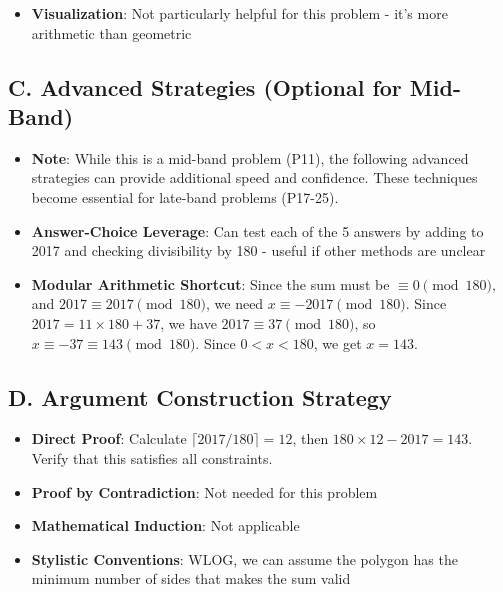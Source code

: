 \documentclass[]{article}
\begin{document}
\begin{strategicbox}
\begin{itemize}[leftmargin=*]
    \item \textbf{Visualization}: Not particularly helpful for this problem - it's more arithmetic than geometric
\end{itemize}

\subsection*{C. Advanced Strategies (Optional for Mid-Band)}
\begin{itemize}[leftmargin=*]
    \item \textbf{Note}: While this is a mid-band problem (P11), the following advanced strategies can provide additional speed and confidence. These techniques become essential for late-band problems (P17-25).
    
    \item \textbf{Answer-Choice Leverage}: Can test each of the 5 answers by adding to 2017 and checking divisibility by 180 - useful if other methods are unclear
    
    \item \textbf{Modular Arithmetic Shortcut}: Since the sum must be $\equiv 0 \pmod{180}$, and $2017 \equiv 2017 \pmod{180}$, we need $x \equiv -2017 \pmod{180}$. Since $2017 = 11 \times 180 + 37$, we have $2017 \equiv 37 \pmod{180}$, so $x \equiv -37 \equiv 143 \pmod{180}$. Since $0 < x < 180$, we get $x = 143$.
\end{itemize}

\subsection*{D. Argument Construction Strategy}
\begin{itemize}[leftmargin=*]
    \item \textbf{Direct Proof}: Calculate $\lceil 2017/180 \rceil = 12$, then $180 \times 12 - 2017 = 143$. Verify that this satisfies all constraints.
    
    \item \textbf{Proof by Contradiction}: Not needed for this problem
    
    \item \textbf{Mathematical Induction}: Not applicable
    
    \item \textbf{Stylistic Conventions}: WLOG, we can assume the polygon has the minimum number of sides that makes the sum valid
\end{itemize}


\end{strategicbox}
\end{document}
